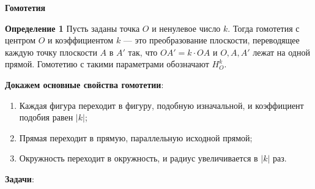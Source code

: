 \documentclass{article}
\begin{document}
\large

\begin{center}
	\textbf{Гомотетия}
\end{center}

\textbf{Определение 1} Пусть заданы точка $O$ и ненулевое число $k$. Тогда гомотетия с центром $O$ и коэффициентом $k$ — это преобразование плоскости, переводящее каждую точку плоскости $A$ в $A'$ так, что $OA' = k\cdot OA$ и $O, A, A'$ лежат на одной прямой. Гомотетию с такими параметрами обозначают $H^k_O$.

\textbf{Докажем основные свойства гомотетии}:

\begin{enumerate}[label*=\protect\fbox{\arabic{enumi}}]
	
\item Каждая фигура переходит в фигуру, подобную изначальной, и коэффициент подобия равен $|k|$;

\item Прямая переходит в прямую, параллельную исходной прямой;

\item Окружность переходит в окружность, и радиус увеличивается в $|k|$ раз.

\end{enumerate}

\textbf{Задачи}:
\end{document}
